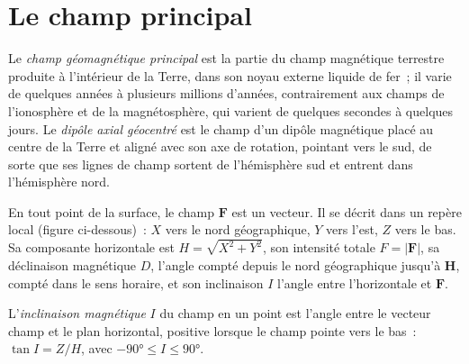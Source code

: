 \section{Le champ principal}

\begin{definition}\label{def:b3:palaeomagnetism:main-field}
Le \emph{champ géomagnétique principal} est la partie du
champ magnétique terrestre produite à l'intérieur de la Terre, dans son noyau
externe liquide de fer~; il varie de quelques années à plusieurs millions d'années, contrairement aux champs de
l'ionosphère et de la magnétosphère, qui varient de quelques secondes à quelques jours. Le
\emph{dipôle axial géocentré} est le champ d'un dipôle
magnétique placé au centre de la Terre et aligné avec son axe de rotation, pointant vers le
sud, de sorte que ses lignes de champ sortent de l'hémisphère sud et
entrent dans l'hémisphère nord.
\end{definition}

En tout point de la surface, le champ $\mathbf F$ est un vecteur. Il se décrit
dans un repère local (figure ci-dessous)~: $X$ vers le nord géographique, $Y$ vers
l'est, $Z$ vers le bas. Sa composante horizontale est $H = \sqrt{X^2 + Y^2}$, son
intensité totale $F = |\mathbf F|$, sa déclinaison magnétique $D$, l'angle compté depuis le
nord géographique jusqu'à $\mathbf H$, compté dans le sens horaire, et son inclinaison $I$ l'angle
entre l'horizontale et $\mathbf F$.

\begin{definition}\label{def:b3:palaeomagnetism:inclination}
L'\emph{inclinaison magnétique} $I$ du champ en
un point est l'angle entre le vecteur champ et le plan horizontal,
positive lorsque le champ pointe vers le bas~: $\tan I = Z/H$, avec $-\ang{90} \le I
\le \ang{90}$.
\end{definition}

